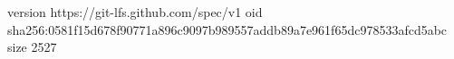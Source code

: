 version https://git-lfs.github.com/spec/v1
oid sha256:0581f15d678f90771a896c9097b989557addb89a7e961f65dc978533afcd5abc
size 2527
